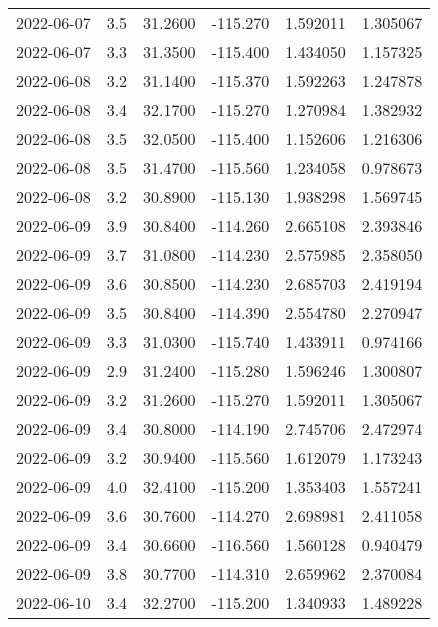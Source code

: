 \begin{tabular}{lrrrrr}
2022-06-07 &       3.5 &  31.2600 &  -115.270 &         1.592011 &         1.305067 \\
2022-06-07 &       3.3 &  31.3500 &  -115.400 &         1.434050 &         1.157325 \\
2022-06-08 &       3.2 &  31.1400 &  -115.370 &         1.592263 &         1.247878 \\
2022-06-08 &       3.4 &  32.1700 &  -115.270 &         1.270984 &         1.382932 \\
2022-06-08 &       3.5 &  32.0500 &  -115.400 &         1.152606 &         1.216306 \\
2022-06-08 &       3.5 &  31.4700 &  -115.560 &         1.234058 &         0.978673 \\
2022-06-08 &       3.2 &  30.8900 &  -115.130 &         1.938298 &         1.569745 \\
2022-06-09 &       3.9 &  30.8400 &  -114.260 &         2.665108 &         2.393846 \\
2022-06-09 &       3.7 &  31.0800 &  -114.230 &         2.575985 &         2.358050 \\
2022-06-09 &       3.6 &  30.8500 &  -114.230 &         2.685703 &         2.419194 \\
2022-06-09 &       3.5 &  30.8400 &  -114.390 &         2.554780 &         2.270947 \\
2022-06-09 &       3.3 &  31.0300 &  -115.740 &         1.433911 &         0.974166 \\
2022-06-09 &       2.9 &  31.2400 &  -115.280 &         1.596246 &         1.300807 \\
2022-06-09 &       3.2 &  31.2600 &  -115.270 &         1.592011 &         1.305067 \\
2022-06-09 &       3.4 &  30.8000 &  -114.190 &         2.745706 &         2.472974 \\
2022-06-09 &       3.2 &  30.9400 &  -115.560 &         1.612079 &         1.173243 \\
2022-06-09 &       4.0 &  32.4100 &  -115.200 &         1.353403 &         1.557241 \\
2022-06-09 &       3.6 &  30.7600 &  -114.270 &         2.698981 &         2.411058 \\
2022-06-09 &       3.4 &  30.6600 &  -116.560 &         1.560128 &         0.940479 \\
2022-06-09 &       3.8 &  30.7700 &  -114.310 &         2.659962 &         2.370084 \\
2022-06-10 &       3.4 &  32.2700 &  -115.200 &         1.340933 &         1.489228 \\

\end{tabular}
